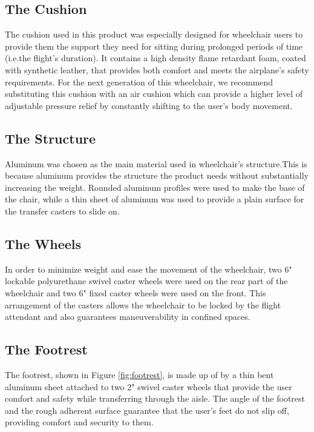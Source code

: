\subsection{The Cushion}

The cushion used in this product was especially designed for wheelchair users to provide them the support they need for sitting during prolonged periods of time (i.e.the  flight's duration). It contains a high density flame retardant foam, coated with synthetic leather, that provides both comfort and meets the airplane’s safety requirements. For the next generation of this wheelchair, we recommend substituting this cushion with an air cushion which can provide a higher level of adjustable pressure relief by constantly shifting to the user's body movement.

\subsection{The Structure}
Aluminum was chosen as the main material used in wheelchair’s  structure.This is because aluminum provides the structure the product needs without substantially increasing the weight. Rounded aluminum profiles were used to make the base of the chair, while a thin sheet of aluminum was used to provide a plain surface for the transfer casters to slide on.



\subsection{The Wheels}
In order to minimize weight and ease the movement of the wheelchair, two 6" lockable polyurethane swivel caster wheels were used on the rear part of the wheelchair and two 6" fixed caster wheels were used on the front. This arrangement of the casters allows the wheelchair to be locked by the flight attendant and also guarantees maneuverability in confined spaces.




\subsection{The Footrest}

The footrest, shown in Figure \ref{fig:footrest},  is made up of by a thin bent aluminum sheet attached to two 2" swivel caster wheels that provide the user comfort and safety while transferring through the aisle. The angle of the footrest and the rough adherent surface guarantee that the user's feet do not slip off, providing comfort and security to them.
 

